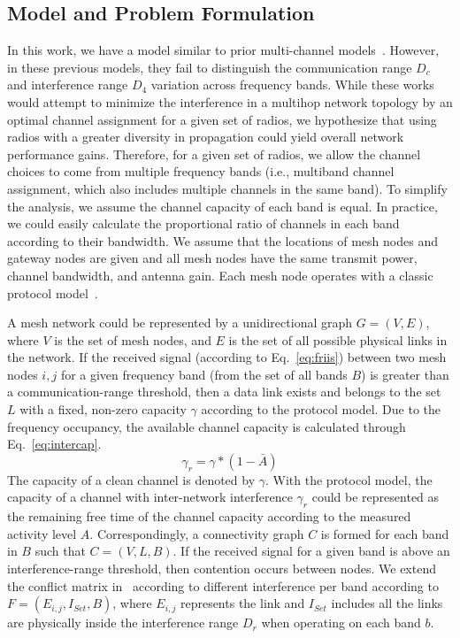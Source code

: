 \subsection{Model and Problem Formulation}
\label{subsec:problem}

In this work, we have a model similar to prior multi-channel models~\cite{tang2005interference,
doraghinejad2014channel,si2010overview}. However, in these previous models, 
they fail to distinguish the communication range $D_c$ and interference range
$D_4$ variation across frequency bands.  
While
these works would attempt to minimize the interference in a multihop network topology
by an optimal channel assignment for a given set of radios, we hypothesize that
using radios with a greater diversity in propagation could yield overall network 
performance gains.  
Therefore, for a given set of radios, we allow the channel
choices to come from multiple frequency bands (i.e., multiband channel 
assignment, which also includes multiple channels in the same band).
To simplify the analysis, we assume the channel capacity of each band is equal.
In practice, we could easily calculate the proportional ratio of channels in 
each band according to their bandwidth.
We assume that the locations of mesh nodes and gateway nodes are given and
all mesh nodes have the same transmit power, channel bandwidth, and antenna gain.
Each mesh node operates with a classic protocol model~\cite{gupta2000capacity}. 

A mesh network could be represented by a unidirectional graph $G=(V,E)$, where
$V$ is the set of mesh nodes, and $E$ is the set of all possible physical links 
in the network. If the received signal (according to Eq.~\ref{eq:friis}) between 
two mesh nodes $i,j$ for a given frequency band (from the set of all bands $B$) 
is greater than a communication-range threshold, then a data link exists and 
belongs to the set $L$ with a fixed, non-zero capacity $\gamma$ according to the protocol 
model.  
Due to the frequency occupancy, the available channel capacity is calculated 
through Eq.~\ref{eq:intercap}.
\begin{equation}
\label{eq:intercap}
\gamma_r=\gamma*(1-\bar{A})
\end{equation}
The capacity of a clean channel is denoted by $\gamma$. With the protocol model, the capacity 
of a channel with inter-network interference $\gamma_r$ could be represented as 
the remaining free time of the channel capacity according to the measured
activity level $A$.
Correspondingly, a connectivity graph $C$ is formed for each 
band in $B$ such that $C=(V,L,B)$.  If the received signal for a given band is 
above an interference-range threshold, then contention occurs between
nodes.  We extend the conflict matrix in~\cite{tang2005interference} according to
different interference per band according to $F=(E_{i,j},I_{Set},B)$, where $E_{i,j}$
represents the link and $I_{Set}$ includes all the links are physically inside 
the interference range $D_r$ when operating on each band $b$.

